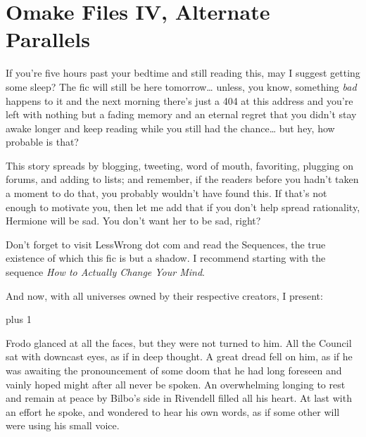 
\makeatletter
\newcommand{\OmakeIVspecialsection}[2][1.5]{%
\vspace*{2\baselineskip plus 1\baselineskip minus 1\baselineskip}%
\noindent\hfill\scalebox{#1}{#2}\hfill\mbox{}%
\vskip 1\baselineskip plus 1\baselineskip%
\@afterindentfalse\@afterheading
}
\makeatother

\newcommand{\OmakeIVsection}[2][1.5]{%
  \OmakeIVspecialsection[#1]{\MakeUppercase{#2}}}

\chapter{Omake Files IV, Alternate Parallels}

\begin{chapterOpeningAuthorNote}
If you're five hours past your bedtime and still reading this, may I suggest getting some sleep? The fic will still be here tomorrow{\ldots} unless, you know, something \emph{bad} happens to it and the next morning there's just a 404 at this address and you're left with nothing but a fading memory and an eternal regret that you didn't stay awake longer and keep reading while you still had the chance{\ldots} but hey, how probable is that?

This story spreads by blogging, tweeting, word of mouth, favoriting, plugging on forums, and adding to lists; and remember, if the readers before you hadn't taken a moment to do that, you probably wouldn't have found this. If that's not enough to motivate you, then let me add that if you don't help spread rationality, Hermione will be sad. You don't want her to be sad, right?

Don't forget to visit LessWrong dot com and read the Sequences, the true existence of which this fic is but a shadow. I recommend starting with the sequence \emph{How to Actually Change Your Mind}.

And now, with all universes owned by their respective creators, I present:
\end{chapterOpeningAuthorNote}

\OmakeIVspecialsection[1.6]{\fontspec[ExternalLocation]{RingBearer}
\settowidth{\versewidth}{\mbox{the}} Lord\scalebox{.40}{\parbox[b]{\versewidth}{%
  \centering of\\
\nointerlineskip\vskip 4pt the}}Ratîonalît\raisebox{-.32ex}{Y}}

Frodo glanced at all the faces, but they were not turned to him. All the Council sat with downcast eyes, as if in deep thought. A great dread fell on him, as if he was awaiting the pronouncement of some doom that he had long foreseen and vainly hoped might after all never be spoken. An overwhelming longing to rest and remain at peace by Bilbo's side in Rivendell filled all his heart. At last with an effort he spoke, and wondered to hear his own words, as if some other will were using his small voice.

